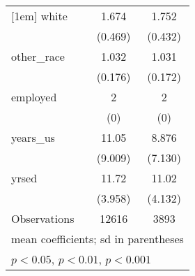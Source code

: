 \begin{table}[htbp]
\begin{tabular}{l*{2}{c}}
[1em]
white               &       1.674         &       1.752         \\
                    &     (0.469)         &     (0.432)         \\
[1em]
other\_race          &       1.032         &       1.031         \\
                    &     (0.176)         &     (0.172)         \\
[1em]
employed            &           2         &           2         \\
                    &         (0)         &         (0)         \\
[1em]
years\_us            &       11.05         &       8.876         \\
                    &     (9.009)         &     (7.130)         \\
[1em]
yrsed               &       11.72         &       11.02         \\
                    &     (3.958)         &     (4.132)         \\
\hline
Observations        &       12616         &        3893         \\
\hline\hline
\multicolumn{3}{l}{\footnotesize mean coefficients; sd in parentheses}\\
\multicolumn{3}{l}{\footnotesize \sym{*} \(p<0.05\), \sym{**} \(p<0.01\), \sym{***} \(p<0.001\)}\\
\end{tabular}
\end{table}

